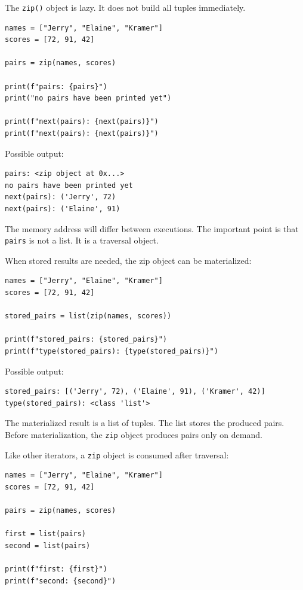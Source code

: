 The \texttt{zip()} object is lazy. It does not build all tuples immediately.

\begin{verbatim}
names = ["Jerry", "Elaine", "Kramer"]
scores = [72, 91, 42]

pairs = zip(names, scores)

print(f"pairs: {pairs}")
print("no pairs have been printed yet")

print(f"next(pairs): {next(pairs)}")
print(f"next(pairs): {next(pairs)}")
\end{verbatim}

Possible output:

\begin{verbatim}
pairs: <zip object at 0x...>
no pairs have been printed yet
next(pairs): ('Jerry', 72)
next(pairs): ('Elaine', 91)
\end{verbatim}

The memory address will differ between executions. The important point is that \texttt{pairs} is not a list. It is a traversal object.

When stored results are needed, the zip object can be materialized:

\begin{verbatim}
names = ["Jerry", "Elaine", "Kramer"]
scores = [72, 91, 42]

stored_pairs = list(zip(names, scores))

print(f"stored_pairs: {stored_pairs}")
print(f"type(stored_pairs): {type(stored_pairs)}")
\end{verbatim}

Possible output:

\begin{verbatim}
stored_pairs: [('Jerry', 72), ('Elaine', 91), ('Kramer', 42)]
type(stored_pairs): <class 'list'>
\end{verbatim}

The materialized result is a list of tuples. The list stores the produced pairs. Before materialization, the \texttt{zip} object produces pairs only on demand.

Like other iterators, a \texttt{zip} object is consumed after traversal:

\begin{verbatim}
names = ["Jerry", "Elaine", "Kramer"]
scores = [72, 91, 42]

pairs = zip(names, scores)

first = list(pairs)
second = list(pairs)

print(f"first: {first}")
print(f"second: {second}")
\end{verbatim}


